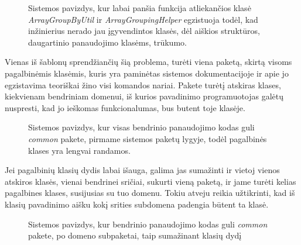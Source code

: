 \begin{figure}[H]
\snugshade
{}
\endsnugshade
\caption{Sistemos pavizdys, kur labai panšia funkcija atliekančios klasė \textit{ArrayGroupByUtil} ir \textit{ArrayGroupingHelper}
egzistuoja todėl, kad inžinierius nerado jau įgyvendintos klasės, dėl aiškios struktūros, daugartinio
panaudojimo klasėms, trūkumo.}
\end{figure}
Vienas iš šablonų sprendžiančių šią problema, turėti viena paketą, skirtą visoms pagalbinėmis klasėmis, kuris yra paminėtas sistemos
dokumentacijoje ir apie jo egzistavima teoriškai žino visi komandos nariai.
Pakete turėtį atskiras klases, kiekvienam bendriniam domenui, iš kurios pavadinimo programuotojas galėtų nuspresti,
kad jo ieškomas funkcionalumas, bus butent toje klasėje.

\begin{figure}[H]
\snugshade
{}
\endsnugshade
\caption{Sistemos pavizdys, kur visas bendrinio panaudojimo kodas guli \textit{common} pakete, pirmame sistemos paketų lygyje, todėl
pagalbinės klases yra lengvai randamos.}
\end{figure}

Jei pagalbinių klasių dydis labai išauga, galima jas sumažinti ir vietoj vienos atskiros klasės, vienai bendrinei sričiai, sukurti vieną paketą,
ir jame turėti kelias pagalbines klases, susijusias su tuo domenu.
Tokiu atveju reikia užtikrinti, kad iš klasių pavadinimo aišku kokį srities subdomena padengia būtent ta klasė.


\begin{figure}[H]
\snugshade
{}
\endsnugshade
\caption{Sistemos pavizdys, kur bendrinio panaudojimo kodas guli \textit{common} pakete, po domeno subpaketai, taip sumažinant klasių dydį }
\end{figure}

